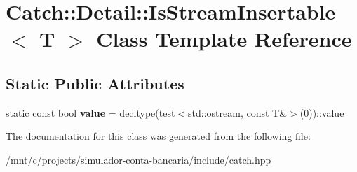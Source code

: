 \hypertarget{classCatch_1_1Detail_1_1IsStreamInsertable}{}\section{Catch\+:\+:Detail\+:\+:Is\+Stream\+Insertable$<$ T $>$ Class Template Reference}
\label{classCatch_1_1Detail_1_1IsStreamInsertable}
\subsection*{Static Public Attributes}
\begin{DoxyCompactItemize}
\item 
\mbox{\label{classCatch_1_1Detail_1_1IsStreamInsertable_a42818b09ae5851126a70ee263769e309}} 
static const bool {\bfseries value} = decltype(test$<$std\+::ostream, const T\&$>$(0))\+::value
\end{DoxyCompactItemize}


The documentation for this class was generated from the following file\+:\begin{DoxyCompactItemize}
\item 
/mnt/c/projects/simulador-\/conta-\/bancaria/include/catch.\+hpp\end{DoxyCompactItemize}
